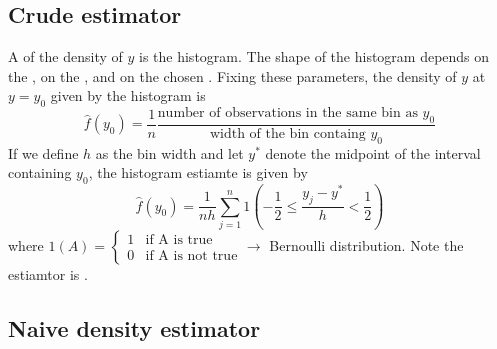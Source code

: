 \subsection{Crude estimator}

A  of the density of $y$ is the histogram.
The shape of the histogram depends on the , on the , and on the chosen .
Fixing these parameters, the density of $y$ at $y=y_0$ given by the histogram is
\begin{equation*}
    \hat{f}(y_0) = \frac{1}{n}\frac{\text{number of observations in the same bin as $y_0$}}{\text{width of the bin containg $y_0$}}
\end{equation*}
If we define $h$ as the bin width and let $y^*$ denote the midpoint of the interval containing $y_0$, the histogram estiamte is given by 
\begin{equation*}
    \hat{f}(y_0) = \frac{1}{nh}\sum_{j=1}^{n}1(-\frac{1}{2}\leq \frac{y_j-y^*}{h}<\frac{1}{2})
\end{equation*}
where $1(A) = \begin{cases}
    1 & \text{if A is true}\\
    0 & \text{if A is not true}
\end{cases} \to $ Bernoulli distribution. Note the estiamtor is .

\subsection{Naive density estimator}

